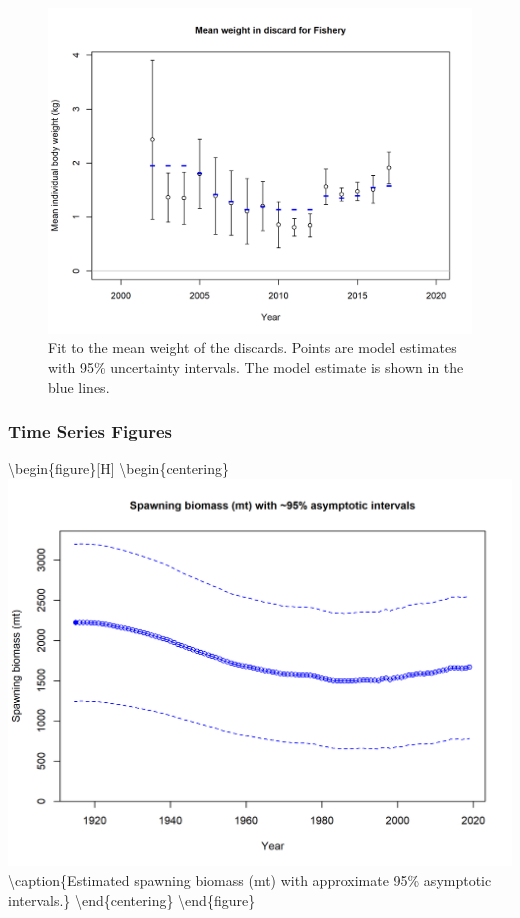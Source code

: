 \documentclass[12pt,]{article}
\begin{document}
\begin{figure}
\centering
\includegraphics{r4ss/plots_mod1/bodywt_fit_fltFishery.png}
\caption{Fit to the mean weight of the discards. Points are model
estimates with 95\% uncertainty intervals. The model estimate is shown
in the blue lines.\label{fig:bodywt_fit_fltFishery}}
\end{figure}

\FloatBarrier

\newpage

\hypertarget{time-series-figures}{%
\subsubsection{Time Series Figures}\label{time-series-figures}}

\FloatBarrier

\textbackslash{}begin\{figure\}{[}H{]}
\textbackslash{}begin\{centering\}
\includegraphics{r4ss/plots_mod1/ts7_Spawning_biomass_(mt)_with_95_asymptotic_intervals_intervals.png}
\textbackslash{}caption\{Estimated spawning biomass (mt) with
approximate 95\% asymptotic
intervals.\}\label{fig:ts7_Spawning_biomass_(mt)_with_95_asymptotic_intervals_intervals}
\textbackslash{}end\{centering\} \textbackslash{}end\{figure\}
\end{document}
